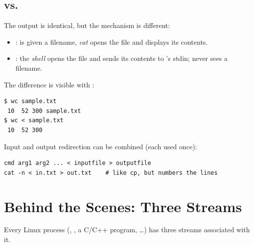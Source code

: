 \subsection*{ vs.\ }
The output is identical, but the mechanism is different:
\begin{itemize}
  \item {}:  is given a filename, \emph{cat} opens
        the file and displays its contents.
  \item {}: the \emph{shell} opens the file and sends its
        contents to 's stdin;  never sees a filename.
\end{itemize}
\begin{center}
\end{center}
The difference is visible with :
\begin{lstlisting}[style=bash]
$ wc sample.txt
 10  52 300 sample.txt
$ wc < sample.txt
 10  52 300
\end{lstlisting}

Input and output redirection can be combined (each used once):
\begin{lstlisting}[style=bash]
cmd arg1 arg2 ... < inputfile > outputfile
cat -n < in.txt > out.txt    # like cp, but numbers the lines
\end{lstlisting}

\section{Behind the Scenes: Three Streams}
Every Linux process (, , a C/C++ program, \dots) has three
streams associated with it.

